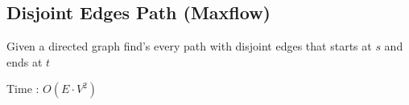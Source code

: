 \subsection{Disjoint Edges Path (Maxflow)}

Given a directed graph find's every path with disjoint edges that starts at $s$ and ends at $t$


Time : $O(E \cdot V^2) $
